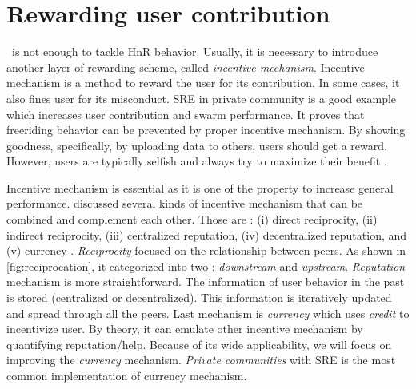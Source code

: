 
\section{Rewarding user contribution}
\label{sec:userreward}

\bt~is not enough to tackle HnR behavior. Usually, it is necessary to introduce another layer of rewarding scheme, called \textit{incentive mechanism}. Incentive mechanism is a method to reward the user for its contribution. In some cases, it also fines user for its misconduct. SRE in private community is a good example which increases user contribution and swarm performance. It proves that freeriding behavior can be prevented by proper incentive mechanism. By showing goodness, specifically, by uploading data to others, users should get a reward. However, users are typically selfish and always try to maximize their benefit \cite{2015:incentivep2pgame:kang}.

Incentive mechanism is essential as it is one of the property to increase general performance. \citeauthor{2011:managesupplydemand:meulpolder} discussed several kinds of incentive mechanism that can be combined and complement each other. Those are : (i) direct reciprocity, (ii) indirect reciprocity, (iii) centralized reputation, (iv) decentralized reputation, and (v) currency \cite{2011:managesupplydemand:meulpolder}. \textit{Reciprocity} focused on the relationship between peers. As shown in \ref{fig:reciprocation}, it categorized into two : \textit{downstream} and \textit{upstream}. \textit{Reputation} mechanism is more straightforward. The information of user behavior in the past is stored (centralized or decentralized). This information is iteratively updated and spread through all the peers. Last mechanism is \textit{currency} which uses \textit{credit} to incentivize user. By theory, it can emulate other incentive mechanism by quantifying reputation/help. Because of its wide applicability, we will focus on improving the \textit{currency} mechanism.  \textit{Private communities} with SRE is the most common implementation of currency mechanism. 

